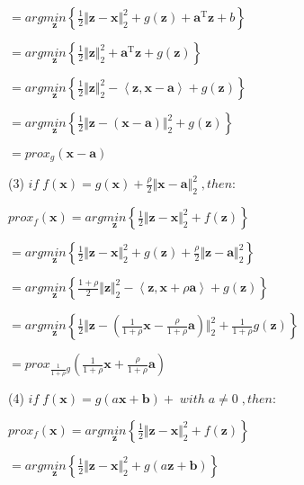 \documentclass[12pt, a4paper, oneside, fontset=windows]{ctexart}
\begin{document}
$=arg\underset{\mathbf z}{min}\left \{ \frac{1}{2}\Vert \mathbf z - \mathbf x \Vert _2^{2}+g\left (\mathbf  z \right )+\mathbf a ^\mathrm{T}\mathbf  z + b\right \}$

$=arg\underset{\mathbf z}{min}\left \{ \frac{1}{2}\Vert \mathbf z \Vert _2^{2}+\mathbf a ^\mathrm{T}\mathbf z+g\left (\mathbf  z \right )\right \}$

$=arg\underset{\mathbf z}{min}\left \{ \frac{1}{2}\Vert \mathbf z \Vert _2^{2}-\left \langle \mathbf z ,\mathbf x -\mathbf a \right \rangle+g\left (\mathbf  z \right )\right \}$

$=arg\underset{\mathbf z}{min}\left \{ \frac{1}{2}\Vert \mathbf z-\left ( \mathbf x-\mathbf a \right ) \Vert _2^{2}+g\left (\mathbf  z \right )\right \}$

$=prox_{g}\left ( \mathbf x-\mathbf a \right )$

(3)
$if \; f\left (\mathbf  x \right )=g\left (\mathbf  x \right )+\frac{\rho }{2}\Vert \mathbf x- \mathbf a\Vert _2^{2}\; ,then:$

$prox_{f}\left ( \mathbf x \right )=arg\underset{\mathbf z}{min}\left \{ \frac{1}{2}\Vert \mathbf z - \mathbf x \Vert _2^{2}+f \left (\mathbf z \right )\right \}$

$=arg\underset{\mathbf z}{min}\left \{ \frac{1}{2}\Vert \mathbf z - \mathbf x \Vert _2^{2}+g\left (\mathbf  z \right )+\frac{\rho }{2}\Vert \mathbf z- \mathbf a\Vert _2^{2}\right \}$

$=arg\underset{\mathbf z}{min}\left \{ \frac{1+\rho }{2}\Vert \mathbf z \Vert _2^{2}-\left \langle \mathbf z ,\mathbf x +\rho \mathbf a \right \rangle+g\left (\mathbf  z \right )\right \}$

$=arg\underset{\mathbf z}{min}\left \{\frac{1}{2}\Vert \mathbf z-\left ( \frac{1}{1+\rho}\mathbf x-\frac{\rho}{1+\rho}\mathbf a \right ) \Vert _2^{2}+ \frac{1}{1+\rho }  g\left (\mathbf  z \right )\right \}$

$=prox_{\frac{1}{1+\rho }g}\left (\frac{1}{1+\rho } \mathbf x+\frac{\rho }{1+\rho }\mathbf a \right )$

(4)
$if \; f\left (\mathbf  x \right )=g\left (a\mathbf  x +\mathbf b\right )+\; with\; a\neq 0\; ,then:$

$prox_{f}\left ( \mathbf x \right )=arg\underset{\mathbf z}{min}\left \{ \frac{1}{2}\Vert \mathbf z - \mathbf x \Vert _2^{2}+f \left (\mathbf z \right )\right \}$

$=arg\underset{\mathbf z}{min}\left \{ \frac{1}{2}\Vert \mathbf z - \mathbf x \Vert _2^{2}+g\left (a\mathbf z+\mathbf b \right )\right \}$
\end{document}
